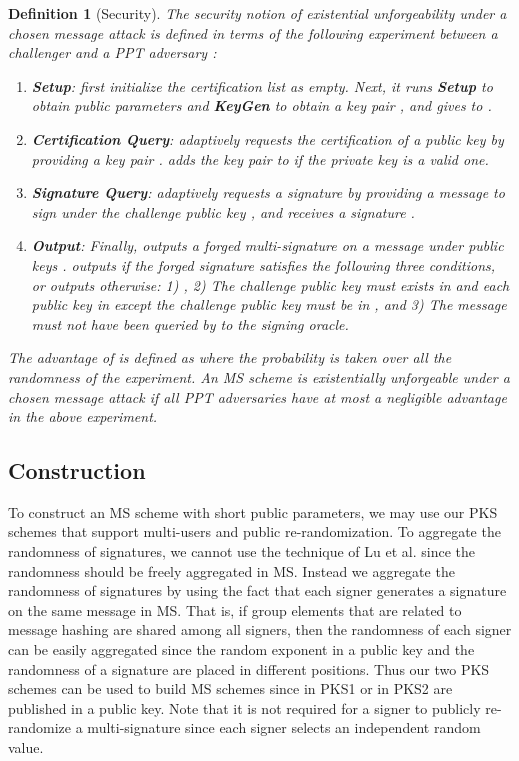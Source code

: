 \documentclass[11pt,letterpaper]{article}
\newtheorem{definition}[theorem]{Definition}
\newcommand{\tb}[1]{\textbf{#1}}
\begin{document}
\begin{definition}[Security]
The security notion of existential unforgeability under a chosen message
attack is defined in terms of the following experiment between a challenger
 and a PPT adversary :
\begin{enumerate}
\item \tb{Setup}:  first initialize the certification list  as
    empty. Next, it runs \tb{Setup} to obtain public parameters  and
    \tb{KeyGen} to obtain a key pair , and gives  to
    .

\item \tb{Certification Query}:  adaptively requests the
    certification of a public key by providing a key pair .
     adds the key pair  to  if the private key is a
    valid one.

\item \tb{Signature Query}:  adaptively requests a signature by
    providing a message  to sign under the challenge public key ,
    and receives a signature .

\item \tb{Output}: Finally,  outputs a forged multi-signature
     on a message  under public keys . 
    outputs  if the forged signature satisfies the following three
    conditions, or outputs  otherwise: 1) , 2) The challenge public key  must exists in
     and each public key in  except the challenge
    public key must be in , and 3) The message  must not have been
    queried by  to the signing oracle.
\end{enumerate}
The advantage of  is defined as  where the probability is taken over all the randomness of the experiment.
An MS scheme is existentially unforgeable under a chosen message attack if
all PPT adversaries have at most a negligible advantage in the above
experiment.
\end{definition}

\subsection{Construction}

To construct an MS scheme with short public parameters, we may use our PKS
schemes that support multi-users and public re-randomization. To aggregate
the randomness of signatures, we cannot use the technique of Lu et al.
\cite{LuOSSW06} since the randomness should be freely aggregated in MS.
Instead we aggregate the randomness of signatures by using the fact that each
signer generates a signature on the same message in MS. That is, if group
elements  that are related to message hashing are shared among all
signers, then the randomness of each signer can be easily aggregated since
the random exponent in a public key and the randomness of a signature are
placed in different positions. Thus our two PKS schemes can be used to build
MS schemes since  in PKS1 or 
in PKS2 are published in a public key. Note that it is not required for a
signer to publicly re-randomize a multi-signature since each signer selects
an independent random value.
\end{document}
